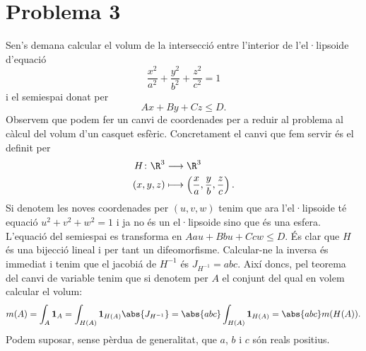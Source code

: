 \section*{Problema 3}
Sen's demana calcular el volum de la intersecció entre l'interior de l'el·lipsoide d'equació \[ \dfrac{x^2}{a^2} + \dfrac{y^2}{b^2} + \dfrac{z^2}{c^2} = 1 \] i el semiespai donat per \[ Ax + By + Cz \leq D . \] Observem que podem fer un canvi de coordenades per a reduir al problema al càlcul del volum d'un casquet esfèric. Concretament el canvi que fem servir és el definit per 
\begin{align*}
	H \colon \R^3 & \longrightarrow \R^3 \\
	(x,y,z) & \longmapsto \left(\dfrac{x}{a},\dfrac{y}{b},\dfrac{z}{c}\right).
\end{align*}
Si denotem les noves coordenades per \( (u,v,w) \) tenim que ara l'el·lipsoide té equació \( u^2 + v^2 + w^2 = 1 \) i ja no és un el·lipsoide sino que és una esfera. L'equació del semiespai es transforma en \( Aau + Bbu + Ccw \leq D \). És clar que \( H \) és una bijecció lineal i per tant un difeomorfisme. Calcular-ne la inversa és immediat i tenim que el jacobiá de \( H^{-1} \) és \( J_{H^{-1}}=abc \). Així doncs, pel teorema del canvi de variable tenim que si denotem per \( A \) el conjunt del qual en volem calcular el volum:
\begin{equation}
	m(A) = \int_A \mathbf{1}_A = \int_{H(A)} \mathbf{1}_{H(A)} \abs{J_{H^{-1}}} = \abs{abc} \int_{H(A)} \mathbf{1}_{H(A)} = \abs{abc}m(H(A)). \label{eq:canvi de variables per simplificar}
\end{equation}
Podem suposar, sense pèrdua de generalitat, que \( a \), \( b \) i \( c \) són reals positius.

